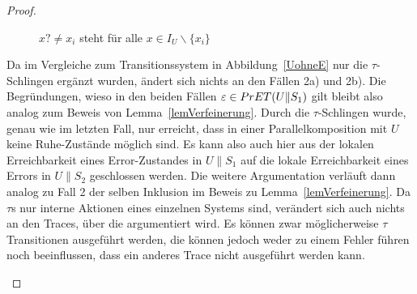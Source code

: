 \begin{proof}
\begin{itemize}
\begin{figure} [h!tbp]
\begin{center}
        \caption{$x?\neq x_i$ steht für alle $x\in I_U\backslash\{x_i\}$}
        \label{UohneEmitTau}
      \end{center}
      \end{figure}
      Da im Vergleiche zum Transitionssystem in Abbildung~\ref{UohneE} nur die
      $\tau$-Schlingen ergänzt wurden, ändert sich nichts an den Fällen 2a) und
      2b). Die Begründungen, wieso in den beiden Fällen $\varepsilon\in
      PrET{}(U\|S_1)$ gilt bleibt also analog zum Beweis von
      Lemma~\ref{lemVerfeinerung}. Durch die $\tau$-Schlingen wurde, genau wie
      im letzten Fall, nur erreicht, dass in einer Parallelkomposition mit $U$
      keine Ruhe-Zustände möglich sind. Es kann also auch hier aus der lokalen
      Erreichbarkeit eines Error-Zustandes in $U\|S_1$ auf die lokale
      Erreichbarkeit eines Errors in $U\|S_2$ geschlossen werden. Die weitere
      Argumentation verläuft dann analog zu Fall 2 der selben Inklusion im
      Beweis zu Lemma~\ref{lemVerfeinerung}. Da $\tau$s nur interne Aktionen
      eines einzelnen Systems sind, verändert sich auch nichts an den Traces,
      über die argumentiert wird. Es können zwar möglicherweise $\tau$
      Transitionen ausgeführt werden, die können jedoch weder zu einem Fehler
      führen noch beeinflussen, dass ein anderes Trace nicht ausgeführt werden
      kann.
  \end{itemize}


\end{proof}

